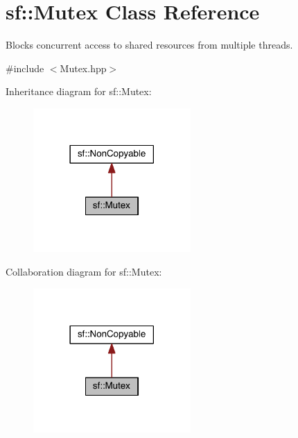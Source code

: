 \hypertarget{classsf_1_1_mutex}{\section{sf\-:\-:Mutex Class Reference}
\label{classsf_1_1_mutex}
}


Blocks concurrent access to shared resources from multiple threads.  




{\ttfamily \#include $<$Mutex.\-hpp$>$}



Inheritance diagram for sf\-:\-:Mutex\-:
\nopagebreak
\begin{figure}[H]
\begin{center}
\leavevmode
\includegraphics[width=170pt]{classsf_1_1_mutex__inherit__graph}
\end{center}
\end{figure}


Collaboration diagram for sf\-:\-:Mutex\-:
\nopagebreak
\begin{figure}[H]
\begin{center}
\leavevmode
\includegraphics[width=170pt]{classsf_1_1_mutex__coll__graph}
\end{center}
\end{figure}
